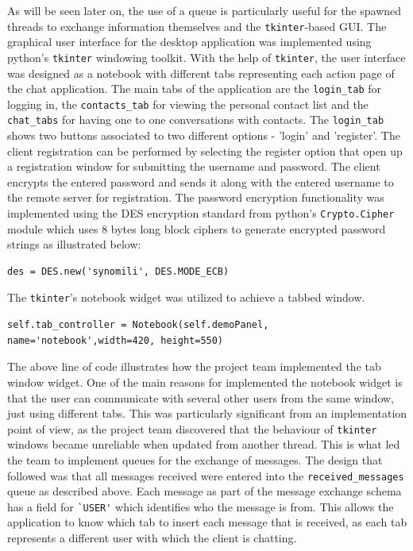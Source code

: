 \documentclass[finalReport.tex]{subfiles}
\begin{document}
As will be seen later on, the use of a queue is particularly useful for the spawned threads to exchange information themselves and the \lstinline'tkinter'-based GUI. The graphical user interface for the desktop application was implemented using python's \lstinline'tkinter' windowing toolkit. With the help of \lstinline'tkinter', the user interface was designed as a notebook with different tabs representing each action page of the chat application. The main tabs of the application are the \lstinline'login_tab' for logging in, the \lstinline'contacts_tab' for viewing the personal contact list and the \lstinline'chat_tabs' for having one to one conversations with contacts. The \lstinline'login_tab' shows two buttons associated to two different options - 'login' and 'register'. The client registration can be performed by selecting the register option that open up a registration window for submitting the username and password. The client encrypts the entered password and sends it along with the entered username to the remote server for registration. The password encryption functionality was implemented using the DES encryption standard from python's \lstinline'Crypto.Cipher' module which uses 8 bytes long block ciphers to generate encrypted password strings as illustrated below:

\begin{lstlisting}
des = DES.new('synomili', DES.MODE_ECB)
\end{lstlisting}


The \lstinline'tkinter''s notebook widget was utilized to achieve a tabbed window. 

\begin{lstlisting}
self.tab_controller = Notebook(self.demoPanel, name='notebook',width=420, height=550)
\end{lstlisting}

The above line of code illustrates how the project team implemented the tab window widget. One of the main reasons for implemented the notebook widget is that the user can communicate with several other users from the same window, just using different tabs. This was particularly significant from an implementation point of view, as the project team discovered that the behaviour of \lstinline'tkinter' windows became unreliable when updated from another thread. This is what led the team to implement queues for the exchange of messages. The design that followed was that all messages received were entered into the \lstinline'received_messages' queue as described above. Each message as part of the message exchange schema has a field for \lstinline-`USER'- which identifies who the message is from. This allows the application to know which tab to insert each message that is received, as each tab represents a different user with which the client is chatting.
\end{document}
